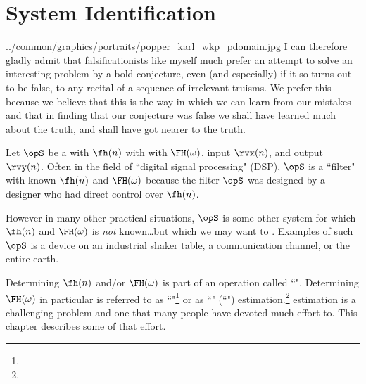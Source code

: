\chapter{System Identification}
  {../common/graphics/portraits/popper_karl_wkp_pdomain.jpg}
  {%
  I can therefore gladly admit that falsificationists like myself much 
  prefer an attempt to solve an interesting problem by a bold conjecture, 
  even (and especially) if it so turns out to be false, 
  to any recital of a sequence of irrelevant truisms. 
  We prefer this because we believe that this is the way in which we can 
  learn from our mistakes and that in finding that our conjecture was false 
  we shall have learned much about the truth, 
  and shall have got nearer to the truth.
  }

Let $\opS$ be a  with  $\fh(n)$ with
with  $\FH(\omega)$,
input $\rvx(n)$, and output $\rvy(n)$. 
Often in the field of ``digital signal processing" (DSP), $\opS$ is a ``filter" 
with known $\fh(n)$ and $\FH(\omega)$ because the filter $\opS$ was 
designed by a designer who had direct control over $\fh(n)$.

However in many other practical situations, $\opS$ is some other system 
for which $\fh(n)$ and $\FH(\omega)$ is \emph{not} known\ldots but which we may
want to . Examples of such $\opS$ is a 
device on an industrial shaker table, a communication channel, or the entire earth.

Determining $\fh(n)$ and/or $\FH(\omega)$ is part of an operation called ``".
Determining $\FH(\omega)$ in particular is referred to as
``"\footnote{}
or as 
``" (``") estimation.\footnote{}
 estimation is a challenging problem and one that
many people have devoted much effort to. 
This chapter describes some of that effort.

